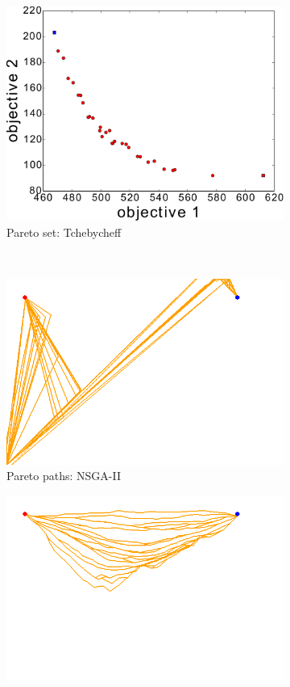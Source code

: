 \documentclass{article}
\begin{document}
\begin{figure}[h!]
\begin{subfigure}[b]{0.3\linewidth}
		\includegraphics[width=\textwidth]{fig/sim2-2obj/PF02-MORRT2.pdf}
		\caption{Pareto set: Tchebycheff}
		\label{fig:sim:norm:pf:c}
	\end{subfigure}  \\
	\begin{subfigure}[b]{0.29\linewidth}
		\centering
		\includegraphics[width=\textwidth]{fig/sim3-2obj/MOPath01-ALL.png}
		\caption{Pareto paths: NSGA-II}
		\label{fig:sim:norm:sols:a}
	\end{subfigure} 
	\begin{subfigure}[b]{0.29\linewidth}
		\centering
		\includegraphics[width=\textwidth]{fig/sim1-2obj/MORRTstar00-ALL.png}

\end{subfigure}
\end{figure}
\end{document}
